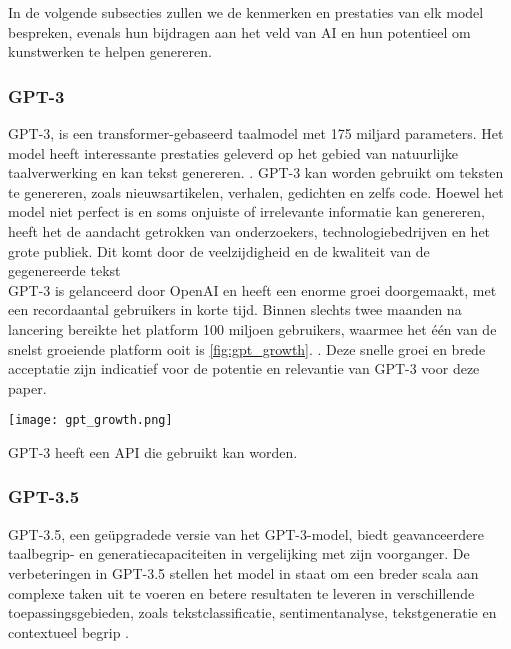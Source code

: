 In de volgende subsecties zullen we de kenmerken en prestaties van elk model bespreken, evenals hun bijdragen aan het veld van AI en hun potentieel om kunstwerken te helpen genereren. \\

\subsubsection{GPT-3}
GPT-3, is een transformer-gebaseerd taalmodel met 175 miljard parameters. Het model heeft interessante prestaties geleverd op het gebied van natuurlijke taalverwerking en kan tekst genereren. \autocite{nytimes_gpt3}. GPT-3 kan worden gebruikt om teksten te genereren, zoals nieuwsartikelen, verhalen, gedichten en zelfs code. Hoewel het model niet perfect is en soms onjuiste of irrelevante informatie kan genereren, heeft het de aandacht getrokken van onderzoekers, technologiebedrijven en het grote publiek. Dit komt door de veelzijdigheid en de kwaliteit van de gegenereerde tekst \autocite{wiki_gpt3} \\

GPT-3 is gelanceerd door OpenAI en heeft een enorme groei doorgemaakt, met een recordaantal gebruikers in korte tijd. Binnen slechts twee maanden na lancering bereikte het platform 100 miljoen gebruikers, waarmee het één van de snelst groeiende platform ooit is \ref{fig:gpt_growth}. \autocite{reuters_chatgpt}. Deze snelle groei en brede acceptatie zijn indicatief voor de potentie en relevantie van GPT-3 voor deze paper.\\

\begin{center}
    \texttt{[image: gpt\_growth.png]}
    \label{fig:gpt_growth}
\end{center}

GPT-3 heeft een API die gebruikt kan worden.

\subsubsection{GPT-3.5}
GPT-3.5, een geüpgradede versie van het GPT-3-model, biedt geavanceerdere taalbegrip- en generatiecapaciteiten in vergelijking met zijn voorganger. De verbeteringen in GPT-3.5 stellen het model in staat om een breder scala aan complexe taken uit te voeren en betere resultaten te leveren in verschillende toepassingsgebieden, zoals tekstclassificatie, sentimentanalyse, tekstgeneratie en contextueel begrip \autocite{gpt_nappier, gpt_cn}. \\

